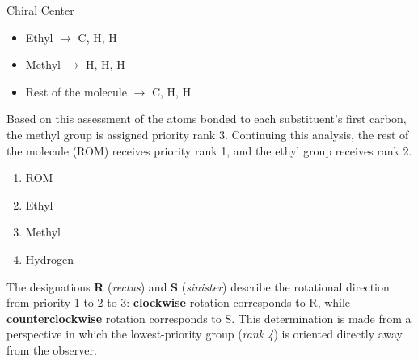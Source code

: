 \documentclass[10pt]{article}
\begin{document}
\begin{core}{Chiral Center}
        \begin{itemize}

          \item Ethyl $\rightarrow$ C, H, H

          \item Methyl $\rightarrow$ H, H, H

          \item Rest of the molecule $\rightarrow$ C, H, H

        \end{itemize}

        Based on this assessment of the atoms bonded to each substituent's first carbon, the methyl group is assigned priority rank 3. Continuing this analysis, the rest of the molecule (ROM) receives priority rank 1, and the ethyl group receives rank 2.

        \begin{enumerate}[label=(\arabic*)]

          \item ROM

          \item Ethyl

          \item Methyl

          \item Hydrogen

        \end{enumerate}

        The designations \textbf{R} (\textit{rectus}) and \textbf{S} (\textit{sinister}) describe the rotational direction from priority 1 to 2 to 3: \textbf{clockwise} rotation corresponds to R, while \textbf{counterclockwise} rotation corresponds to S. This determination is made from a perspective in which the lowest-priority group (\textit{rank 4}) is oriented directly away from the observer.


      \end{core}
\end{document}
